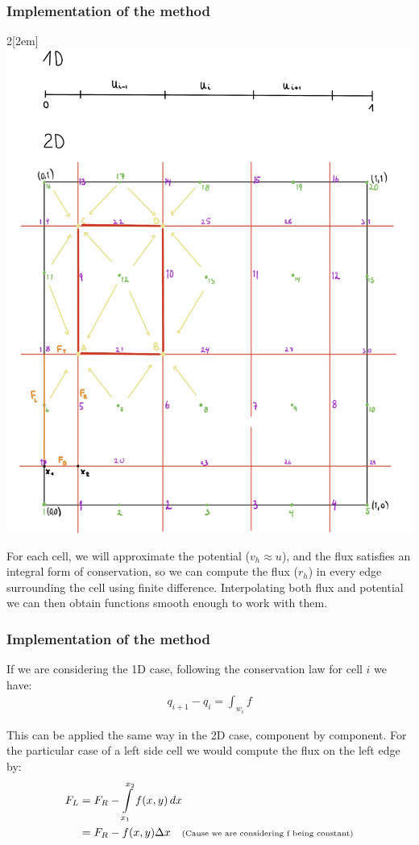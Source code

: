 \documentclass[t]{beamer}
\begin{document}
\begin{frame}
\frametitle{Implementation of the method}
\begin{multicols}{2}[\columnsep2em] 
\includegraphics[width=\linewidth]{square.jpg}
\columnbreak

For each cell, we will approximate the potential ($v_h \approx u$), and the flux satisfies an integral form of conservation, so we can compute the flux ($r_h$) in every edge surrounding the cell using finite difference. Interpolating both flux and potential we can then obtain functions smooth enough to work with them. 
\end{multicols}

\end{frame}

\begin{frame}
\frametitle{Implementation of the method}

If we are considering the 1D case, following the conservation law for cell $i$ we have:
\begin{align*}
q_{i+1} - q_i =  \int_{w_i} f
\end{align*}

This can be applied the same way in the 2D case, component by component. For the particular case of a left side cell we would compute the flux on the left edge by:
\begin{align*}
F_L &= F_R - \int\limits_{x_1}^{x_2} f(x,y) \,dx\ \\
&=  F_R - f(x,y)\Delta x \quad \text{\scriptsize{(Cause we are considering f being constant)}}
\end{align*}
\end{frame}
\end{document}
